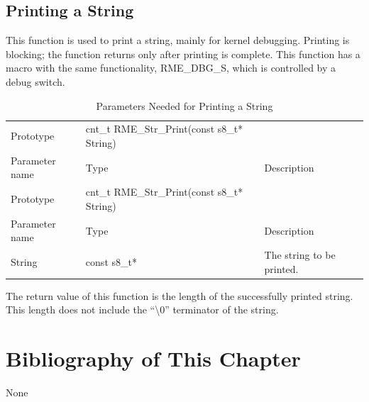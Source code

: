 \subsection{Printing a String}\label{subsec:7-print-string}

This function is used to print a string, mainly for kernel debugging. Printing is blocking; the function returns only after printing is complete. This function has a macro with the same functionality, RME\_DBG\_S, which is controlled by a debug switch.

\begin{xltabular}{\textwidth}{@{}>{\hsize\raggedright\arraybackslash}X>{\hsize\raggedright\arraybackslash}X>{\hsize\raggedright\arraybackslash}X@{}}
\caption{Parameters Needed for Printing a String}\label{tab:7-90-print-string-parameters}\\
\toprule
Prototype & cnt\_t RME\_Str\_Print(const s8\_t* String) &\tabularnewline
Parameter name & Type & Description\tabularnewline
\endfirsthead
\toprule
Prototype & cnt\_t RME\_Str\_Print(const s8\_t* String) &\tabularnewline
Parameter name & Type & Description\tabularnewline
\midrule
\endhead
\bottomrule
\endlastfoot
String & const s8\_t* & The string to be printed.\tabularnewline
\end{xltabular}
\nopagebreak[4]

The return value of this function is the length of the successfully printed string. This length does not include the ``\textbackslash0'' terminator of the string.

\section{Bibliography of This Chapter}\label{sec:7-chapter-bibliography}

None
